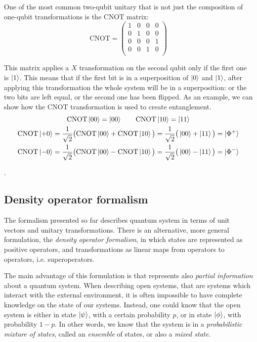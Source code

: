 One of the most common two-qubit unitary that is not just the composition of one-qubit transformations is the CNOT matrix:
\[\text{CNOT} = 
\begin{pmatrix}
1 & 0 & 0 & 0 \\
0 & 1 & 0 & 0 \\
0 & 0 & 0 & 1 \\
0 & 0 & 1 & 0 \\
\end{pmatrix}
\]

This matrix applies a $X$ transformation on the second qubit only if the first one is $\ket{1}$. This means that if the first bit is in a superposition of $\ket{0}$ and $\ket{1}$, after applying this transformation the whole system will be in a superposition: or the two bits are left equal, or the second one has been flipped. As an example, we can show how the CNOT transformation is used to create entanglement.
\begin{gather*}
\text{CNOT} \ket{00} = \ket{00} \qquad \text{CNOT} \ket{10} = \ket{11} \\
\text{CNOT} \ket{+0} = \frac{1}{\sqrt{2}}\big(\text{CNOT}\ket{00} + \text{CNOT}\ket{10}\big) = \frac{1}{\sqrt{2}}
\big(\ket{00} + \ket{11}\big) = \ket{\Phi^+}\\
\text{CNOT} \ket{-0} = \frac{1}{\sqrt{2}}\big(\text{CNOT}\ket{00} - \text{CNOT}\ket{10}\big) = \frac{1}{\sqrt{2}}
\big(\ket{00} - \ket{11}\big) = \ket{\Phi^-}
\end{gather*}

.\subsection{Density operator formalism}

The formalism presented so far describes quantum system in terms of unit vectors and unitary transformations. There is an alternative, more general formulation, the \textit{density operator formalism}, in which states are represented as positive operators, and transformations as linear maps from operators to operators, i.e. superoperators.

The main advantage of this formulation is that represents also \textit{partial information} about a quantum system. When describing open systems, that are systems which interact with the external environment, it is often impossible to have complete knowledge on the state of our systems. Instead, one could know that the open system is either in state $\ket{\psi}$, with a certain probability $p$, or in state $\ket{\phi}$, with probability $1-p$. In other words, we know that the system is in a \textit{probabilistic mixture of states}, called an \textit{ensemble} of states, or also a \textit{mixed state}.

